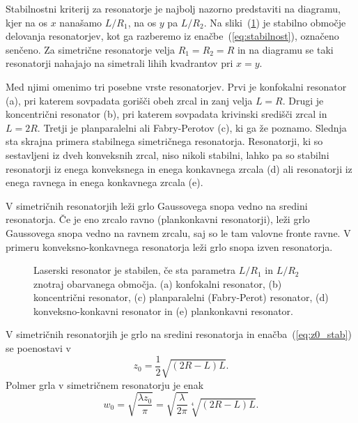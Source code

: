 Stabilnostni kriterij za resonatorje je najbolj nazorno predstaviti na diagramu, 
kjer na os $x$ nanašamo $L/R_{1}$, na os $y$ pa $L/R_{2}$. Na 
sliki~(\ref{fig:Podrocje-stabilnih-resonatorjev}) je stabilno območje delovanja 
resonatorjev, kot ga razberemo iz enačbe~(\ref{eq:stabilnost}), označeno senčeno.
Za simetrične resonatorje 
velja $R_{1}=R_{2}=R$ in na diagramu se taki resonatorji nahajajo na simetrali 
lihih kvadrantov pri $x=y$. 

Med njimi omenimo tri posebne vrste resonatorjev.
Prvi je konfokalni resonator (a), 
pri katerem sovpadata gorišči obeh zrcal in zanj velja $L=R$. Drugi je 
koncentrični resonator (b), pri katerem sovpadata krivinski središči zrcal in $L=2R$.
Tretji je planparalelni ali Fabry-Perotov (c), ki ga že poznamo. 
Slednja sta skrajna primera stabilnega simetričnega resonatorja. 
Resonatorji, ki so sestavljeni iz dveh konveksnih zrcal, niso nikoli stabilni, lahko
pa so stabilni resonatorji iz enega konveksnega in enega konkavnega zrcala (d)
ali resonatorji iz enega ravnega in enega konkavnega zrcala (e). 

V simetričnih resonatorjih leži grlo Gaussovega snopa vedno na sredini resonatorja.
Če je eno zrcalo ravno (plankonkavni resonatorji), leži grlo Gaussovega snopa vedno 
na ravnem zrcalu, saj so le tam valovne fronte ravne. V primeru konveksno-konkavnega 
resonatorja leži grlo snopa izven resonatorja. 

\begin{figure}[h]
\centering
\def\svgwidth{100truemm} 

\caption{Laserski resonator je stabilen, 
če sta parametra $L/R_{1}$ in $L/R_{2}$ znotraj obarvanega območja. 
(a) konfokalni resonator,
(b) koncentrični resonator, 
(c) planparalelni (Fabry-Perot) resonator, 
(d) konveksno-konkavni resonator 
in (e) plankonkavni resonator.}
\label{fig:Podrocje-stabilnih-resonatorjev}
\end{figure}

V simetričnih resonatorjih je grlo na sredini resonatorja in enačba~(\ref{eq:z0_stab}) 
se poenostavi v 
\begin{equation}
z_{0}=\frac{1}{2}\sqrt{(2R-L)L}.
\label{eq:zosim}
\end{equation}
Polmer grla v simetričnem resonatorju je enak
\begin{equation}
w_{0}=\sqrt{\frac{\lambda z_{0}}{\pi}}=\sqrt{\frac{\lambda}{2\pi}}\sqrt[4]{(2R-L)L}.
\label{eq:grlo_v_res}
\end{equation}

